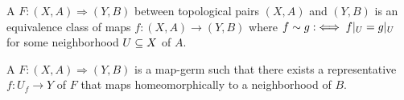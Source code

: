 \begin{mydefinition}
    A  $F: (X, A) \Rightarrow (Y, B)$ between topological pairs $(X, A)$ and $(Y, B)$ is an equivalence class of maps $f: (X, A) \to (Y, B)$
    where $f \sim g :\iff f\vert_{U} = g\vert_{U}$ for some neighborhood $U \subseteq{} X$ of $A$. 
\end{mydefinition}

\begin{myparagraph}
    A  $F: (X, A) \Rightarrow (Y, B)$ is a map-germ
    such that there exists a representative $f: U_f \to Y$ of $F$ that maps homeomorphically to a neighborhood of $B$.  
\end{myparagraph}